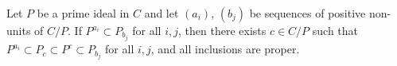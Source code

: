 Let $P$ be a prime ideal in $C$ and let $(a_i)$, $(b_j)$ be sequences of positive non-units of $C/P$. If $P^{a_i} \subset P_{b_j}$ for all $i, j$, then there exists $c \in C/P$ such that $P^{a_i} \subset P_c \subset P^c \subset P_{b_j}$ for all $i, j$, and all inclusions are proper.
